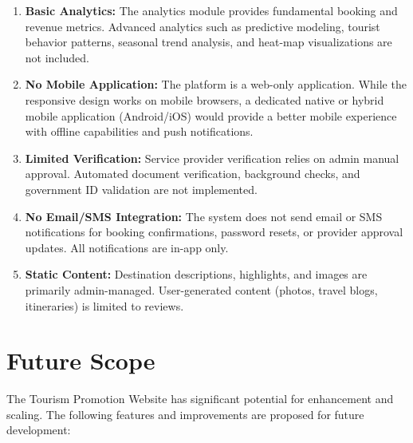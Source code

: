 \begin{enumerate}[leftmargin=2em]
    \item \textbf{Basic Analytics:} The analytics module provides fundamental booking and revenue metrics. Advanced analytics such as predictive modeling, tourist behavior patterns, seasonal trend analysis, and heat-map visualizations are not included.

    \item \textbf{No Mobile Application:} The platform is a web-only application. While the responsive design works on mobile browsers, a dedicated native or hybrid mobile application (Android/iOS) would provide a better mobile experience with offline capabilities and push notifications.

    \item \textbf{Limited Verification:} Service provider verification relies on admin manual approval. Automated document verification, background checks, and government ID validation are not implemented.

    \item \textbf{No Email/SMS Integration:} The system does not send email or SMS notifications for booking confirmations, password resets, or provider approval updates. All notifications are in-app only.

    \item \textbf{Static Content:} Destination descriptions, highlights, and images are primarily admin-managed. User-generated content (photos, travel blogs, itineraries) is limited to reviews.
\end{enumerate}

\section{Future Scope}

The Tourism Promotion Website has significant potential for enhancement and scaling. The following features and improvements are proposed for future development:

